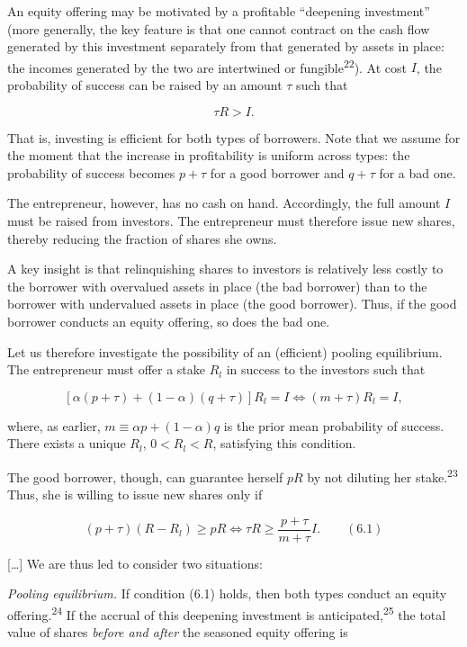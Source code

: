 \documentclass[11pt,a4paper]{article}
\begin{document}
An equity offering may be motivated by a profitable ``deepening investment'' (more generally, the
key feature is that one cannot contract on the cash flow generated by this investment separately
from that generated by assets in place: the incomes generated by the two are intertwined or
fungible\textsuperscript{22}). At cost \(I\), the probability of success can be raised by an amount
\(\tau\) such that

\[\tau R > I.\]

That is, investing is efficient for both types of borrowers. Note that we assume for the moment that
the increase in profitability is uniform across types: the probability of success becomes
\(p + \tau\) for a good borrower and \(q + \tau\) for a bad one.

The entrepreneur, however, has no cash on hand. Accordingly, the full amount \(I\) must be raised
from investors. The entrepreneur must therefore issue new shares, thereby reducing the fraction of
shares she owns.

A key insight is that relinquishing shares to investors is relatively less costly to the borrower
with overvalued assets in place (the bad borrower) than to the borrower with undervalued assets in
place (the good borrower). Thus, if the good borrower conducts an equity offering, so does the bad
one.

Let us therefore investigate the possibility of an (efficient) pooling equilibrium. The entrepreneur
must offer a stake \(R_l\) in success to the investors such that

\[[\alpha(p + \tau) + (1 - \alpha)(q + \tau)]R_l = I \iff (m + \tau)R_l = I,\]

where, as earlier, \(m \equiv \alpha p + (1 - \alpha)q\) is the prior mean probability of success.
There exists a unique \(R_l\), \(0 < R_l < R\), satisfying this condition.

The good borrower, though, can guarantee herself \(pR\) by not diluting her
stake.\textsuperscript{23} Thus, she is willing to issue new shares only if

\[(p + \tau)(R - R_l) \geqslant pR \iff \tau R \geqslant \frac{p + \tau}{m + \tau} I. \qquad (6.1)\]

{[}\ldots{]} We are thus led to consider two situations:

\emph{Pooling equilibrium.} If condition (6.1) holds, then both types conduct an equity
offering.\textsuperscript{24} If the accrual of this deepening investment is
anticipated,\textsuperscript{25} the total value of shares \emph{before and after} the seasoned
equity offering is
\end{document}
